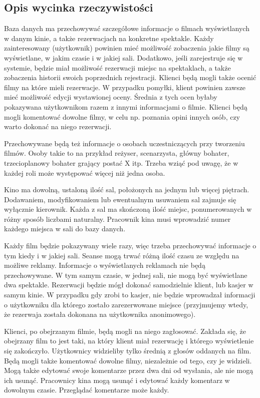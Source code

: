 \subsection*{Opis wycinka rzeczywistości}
Baza danych ma przechowywać szczegółowe informacje o filmach wyświetlanych w danym kinie, a także rezerwacjach na konkretne spektakle.
Każdy zainteresowany (użytkownik) powinien mieć możliwość zobaczenia jakie filmy są wyświetlane, w jakim czasie i w jakiej sali.
Dodatkowo, jeśli zarejestruje się w systemie, będzie miał możliwość rezerwacji miejsc na spektaklach, a także zobaczenia historii swoich poprzednich rejestracji.
Klienci będą mogli także ocenić filmy na które mieli rezerwacje. W przypadku pomyłki, klient powinien zawsze mieć możliwość edycji wystawionej oceny. Średnia z tych ocen byłaby pokazywana użytkownikom razem z innymi informacjami o filmie.
Klienci będą mogli komentować dowolne filmy, w celu np. poznania opini innych osób, czy warto dokonać na niego rezerwacji.
 
Przechowywane będą też informacje o osobach uczestniczących przy tworzeniu filmów. Osoby takie to na przykład reżyser, scenarzysta, główny bohater, trzecioplanowy bohater grający postać X itp. Trzeba wziąć pod uwagę, że w każdej roli może występować więcej niż jedna osoba.

Kino ma dowolną, ustaloną ilość sal, położonych na jednym lub więcej piętrach. Dodawaniem, modyfikowaniem lub ewentualnym usuwaniem sal zajmuje się wyłącznie kierownik. Każda z sal ma skończoną ilość miejsc, ponumerowanych w różny sposób liczbami naturalny. Pracownik kina musi wprowadzić numer każdego miejsca w sali do bazy danych.

Każdy film będzie pokazywany wiele razy, więc trzeba przechowywać informacje o tym kiedy i w jakiej sali. Seanse mogą trwać różną ilość czasu ze względu na możliwe reklamy. Informacje o wyświetlanych reklamach nie będą przechowywane. W tym samym czasie, w jednej sali, nie mogą być wyświetlane dwa spektakle.
Rezerwacji będzie mógł dokonać samodzielnie klient, lub kasjer w samym kinie. W przypadku gdy zrobi to kasjer, nie będzie wprowadzał informacji o użytkowniku dla którego zostało zarezerwowane miejsce (przyjmujemy wtedy, że rezerwaja została dokonana na użytkownika anonimowego).

Klienci, po obejrzanym filmie, będą mogli na niego zagłosować. Zakłada się, że obejrzany film to jest taki, na który klient miał rezerwację i którego wyświetlenie się zakończyło. Użytkownicy widzieliby tylko średnią z głosów oddanych na film. Będą mogli także komentować dowolne filmy, niezależnie od tego, czy je widzieli. Mogą także edytować swoje komentarze przez dwa dni od wysłania, ale nie mogą ich usunąć. Pracownicy kina mogą usunąć i edytować każdy komentarz w dowolnym czasie. Przeglądać komentarze może każdy.

